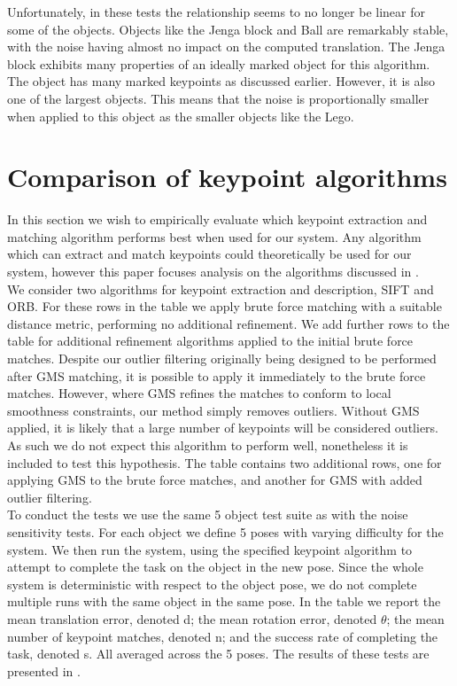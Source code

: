 Unfortunately, in these tests the relationship seems to no longer be linear for some of the objects. Objects like the Jenga block and Ball are remarkably stable, with the noise having almost no impact on the computed translation. The Jenga block exhibits many properties of an ideally marked object for this algorithm. The object has many marked keypoints as discussed earlier. However, it is also one of the largest objects. This means that the noise is proportionally smaller when applied to this object as the smaller objects like the Lego.

\section{Comparison of keypoint algorithms}
\label{sec:algos-test}
In this section we wish to empirically evaluate which keypoint extraction and matching algorithm performs best when used for our system. Any algorithm which can extract and match keypoints could theoretically be used for our system, however this paper focuses analysis on the algorithms discussed in .\\

We consider two algorithms for keypoint extraction and description, SIFT and ORB. For these rows in the table we apply brute force matching with a suitable distance metric, performing no additional refinement. We add further rows to the table for additional refinement algorithms applied to the initial brute force matches. Despite our outlier filtering originally being designed to be performed after GMS matching, it is possible to apply it immediately to the brute force matches. However, where GMS refines the matches to conform to local smoothness constraints, our method simply removes outliers. Without GMS applied, it is likely that a large number of keypoints will be considered outliers. As such we do not expect this algorithm to perform well, nonetheless it is included to test this hypothesis. The table contains two additional rows, one for applying GMS to the brute force matches, and another for GMS with added outlier filtering.\\

To conduct the tests we use the same 5 object test suite as with the noise sensitivity tests. For each object we define 5 poses with varying difficulty for the system. We then run the system, using the specified keypoint algorithm to attempt to complete the task on the object in the new pose. Since the whole system is deterministic with respect to the object pose, we do not complete multiple runs with the same object in the same pose. In the table we report the mean translation error, denoted d; the mean rotation error, denoted $\theta$; the mean number of keypoint matches, denoted n; and the success rate of completing the task, denoted s. All averaged across the 5 poses. The results of these tests are presented in .\\

